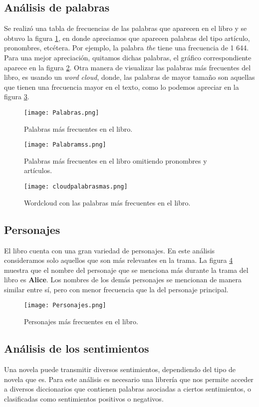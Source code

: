 \documentclass[12pt,letterpaper]{article}
\begin{document}
\subsection{Análisis de palabras}
Se realizó una tabla de frecuencias de las palabras que aparecen en el libro y se obtuvo la figura \ref{Palabras}, en donde apreciamos que aparecen palabras del tipo artículo, pronombres, etcétera. Por ejemplo, la palabra \textit{the} tiene una frecuencia de 1 644. Para una mejor apreciación, quitamos dichas palabras, el gráfico correspondiente aparece en la figura  \ref{Palabrasmas}.
Otra manera de visualizar las palabras más frecuentes del libro, es usando un \textit{word cloud}, donde, las palabras de mayor tamaño son aquellas que tienen una frecuencia mayor en el texto,  como lo podemos apreciar en la figura \ref{cloudpalabras}.
\begin{figure}
\centering
\caption{Palabras más frecuentes en el libro.}
\label{Palabras}
\texttt{[image: Palabras.png]}
\end{figure}
\begin{figure}
\centering
\caption{Palabras más frecuentes en el libro omitiendo pronombres y artículos.}
\label{Palabrasmas}
\texttt{[image: Palabramss.png]}
\end{figure}
\begin{figure}
\centering
\caption{Wordcloud con las palabras más frecuentes en el libro.}
\label{cloudpalabras}
\texttt{[image: cloudpalabrasmas.png]}

\end{figure}
\subsection{Personajes}
El libro cuenta con una gran variedad de personajes. En este análisis consideramos solo aquellos que son más relevantes en la trama. La figura \ref{Personajes} muestra que el nombre del personaje que se menciona más durante la trama del libro es \textbf{Alice}. Los nombres de los demás personajes se mencionan de manera similar entre sí, pero con menor frecuencia que la del personaje principal.

\begin{figure}
\centering
\caption{Personajes más frecuentes en el libro.}
\label{Personajes}
\texttt{[image: Personajes.png]}
\end{figure}


\subsection{Análisis de los sentimientos}
Una novela puede transmitir diversos sentimientos, dependiendo del tipo de novela que es. Para este análisis es necesario una librería que nos permite acceder a diversos diccionarios que contienen palabras asociadas a ciertos sentimientos, o clasificadas como sentimientos positivos o negativos.
\end{document}

